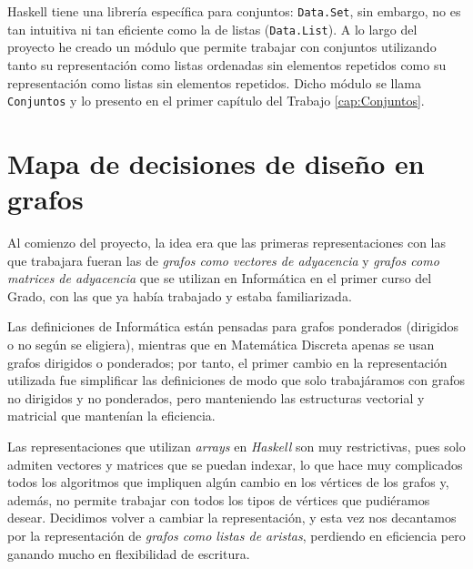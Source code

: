 Haskell tiene una librería específica para conjuntos: \texttt{Data.Set}, sin
embargo, no es tan intuitiva ni tan eficiente como la de listas 
(\texttt{Data.List}). A lo largo del proyecto he creado un módulo que permite
trabajar con conjuntos utilizando tanto su representación como listas ordenadas
sin elementos repetidos como su representación como listas sin elementos
repetidos. Dicho módulo se llama \texttt{Conjuntos} y lo presento en el primer
capítulo del Trabajo \ref{cap:Conjuntos}.


\section{Mapa de decisiones de diseño en grafos}

Al comienzo del proyecto, la idea era que las primeras representaciones con las
que trabajara fueran las de \textit{grafos como vectores de adyacencia} y 
\textit{grafos como matrices de adyacencia} que se utilizan en Informática en el
primer curso del Grado, con las que ya había trabajado y estaba familiarizada. 

Las definiciones de Informática están pensadas para grafos ponderados (dirigidos
o no según se eligiera), mientras que en Matemática Discreta apenas se usan 
grafos dirigidos o ponderados; por tanto, el primer cambio en la representación 
utilizada fue simplificar las definiciones de modo que solo trabajáramos con
grafos no dirigidos y no ponderados, pero manteniendo las estructuras vectorial
y matricial que mantenían la eficiencia. 

Las representaciones que utilizan \textit{arrays} en \textit{Haskell} son muy
restrictivas, pues solo admiten vectores y matrices que se puedan indexar, lo
que hace muy complicados todos los algoritmos que impliquen algún cambio en los
vértices de los grafos y, además, no permite trabajar con todos los tipos de
vértices que pudiéramos desear. Decidimos volver a cambiar la representación, y
esta vez nos decantamos por la representación de \textit{grafos como listas de
aristas}, perdiendo en eficiencia pero ganando mucho en flexibilidad de
escritura.


